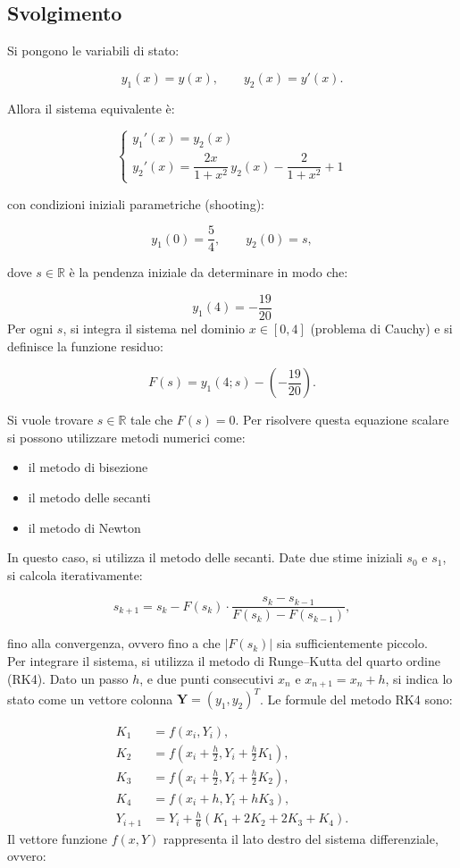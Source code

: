 \documentclass[11pt]{article}
\begin{document}
\subsection{Svolgimento}
Si pongono le variabili di stato:

\[
y_1(x) = y(x), \qquad y_2(x) = y'(x).
\]

Allora il sistema equivalente è:

\[
\begin{cases}
y_1'(x) = y_2(x) \\
y_2'(x) = \dfrac{2x}{1 + x^2} \, y_2(x) - \dfrac{2}{1 + x^2} + 1
\end{cases}
\]

con condizioni iniziali parametriche (shooting):

\[
y_1(0) = \frac{5}{4}, \qquad y_2(0) = s,
\]

dove \( s \in \mathbb{R} \) è la pendenza iniziale da determinare in modo che:

\[
y_1(4) = -\frac{19}{20}
\]
Per ogni \( s \), si integra il sistema nel dominio \( x \in [0, 4] \) (problema di Cauchy) e si definisce la funzione residuo:

\[
F(s) = y_1(4; s) - \left(-\frac{19}{20}\right).
\]

Si vuole trovare \( s \in \mathbb{R} \) tale che \( F(s) = 0 \).  
Per risolvere questa equazione scalare si possono utilizzare metodi numerici come:
\begin{itemize}
	\item il metodo di bisezione
	\item il metodo delle secanti
	\item il metodo di Newton
\end{itemize}
In questo caso, si utilizza il metodo delle secanti.  
Date due stime iniziali \( s_0 \) e \( s_1 \), si calcola iterativamente:

\[
s_{k+1} = s_k - F(s_k) \cdot \frac{s_k - s_{k-1}}{F(s_k) - F(s_{k-1})},
\]

fino alla convergenza, ovvero fino a che \( |F(s_k)| \) sia sufficientemente piccolo.\\
Per integrare il sistema, si utilizza il metodo di Runge–Kutta del quarto ordine (RK4).  
Dato un passo \( h \), e due punti consecutivi \( x_n \) e \( x_{n+1} = x_n + h \),  
si indica lo stato come un vettore colonna \( \mathbf{Y} = (y_1, y_2)^T \).  
Le formule del metodo RK4 sono:

\[
\begin{aligned}
K_1 &= f(x_i, Y_i), \\
K_2 &= f\left(x_i + \frac{h}{2}, Y_i + \frac{h}{2} K_1\right), \\
K_3 &= f\left(x_i + \frac{h}{2}, Y_i + \frac{h}{2} K_2\right), \\
K_4 &= f(x_i + h, Y_i + h K_3), \\
Y_{i+1} &= Y_i + \frac{h}{6} \left(K_1 + 2K_2 + 2K_3 + K_4\right).
\end{aligned}
\]
Il vettore funzione \(f(x, Y)\) rappresenta il lato destro del sistema differenziale, ovvero:
\end{document}
